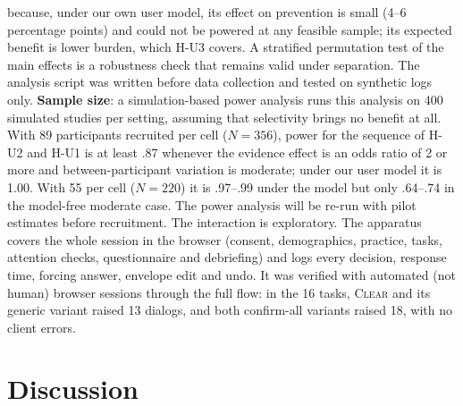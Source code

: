 \documentclass[preprint,12pt,nonatbib]{elsarticle}
\theoremstyle{remark}
\newcommand{\clear}{\textsc{Clear}}
\begin{document}
because, under our own user model, its effect on prevention is small (4--6
percentage points) and could not be powered at any feasible sample; its expected
benefit is lower burden, which H-U3 covers. A stratified permutation test of the
main effects is a robustness check that remains valid under separation. The
analysis script was written before data collection and tested on synthetic logs
only.
\textbf{Sample size}: a simulation-based power analysis runs this analysis on
400 simulated studies per setting, assuming that selectivity brings no benefit
at all. With 89 participants recruited per cell ($N=356$), power for the
sequence of H-U2 and H-U1 is at least .87 whenever the evidence effect is an
odds ratio of 2 or more and between-participant variation is moderate; under our
user model it is 1.00. With 55 per cell ($N=220$) it is .97--.99 under the model
but only .64--.74 in the model-free moderate case. The power analysis will be
re-run with pilot estimates before recruitment. The interaction is exploratory.
The apparatus covers the whole session in the browser (consent, demographics,
practice, tasks, attention checks, questionnaire and debriefing) and logs every
decision, response time, forcing answer, envelope edit and undo. It was
verified with automated (not human) browser sessions through the full flow: in
the 16 tasks, \clear{} and its generic variant raised 13 dialogs, and both
confirm-all variants raised 18, with no client errors.

\section{Discussion}
\label{sec:discussion}
\end{document}
